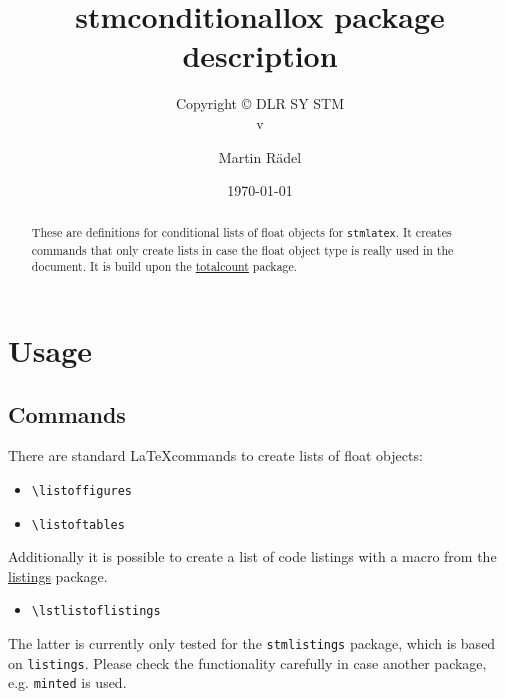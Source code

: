 \documentclass[%
  type=article,%
  layout=koma,%
  hyperref=true,%
  conditionallox=false,%
  date=true,%
  listings=true%
]{stmtext}
\author{Martin R\"{a}del}
\title{stmconditionallox package description}
\subtitle{Copyright \copyright{} \the\year{} DLR SY STM\\v\formatdate[versiondatestyle]{\DTMToday}}
\date{\today}
\begin{document}
\maketitle

\begin{abstract}
These are definitions for conditional lists of float objects for \texttt{stmlatex}. It creates commands that only create lists in case the float object type is really used in the document. It is build upon the \href{https://ctan.org/pkg/totalcount}{totalcount} package.
\end{abstract}

\tableofcontents

\conditionallistoffigures  %
\conditionallistoftables   %
\conditionallistoflistings %

\section{Usage}

\subsection{Commands}

There are standard \LaTeX commands to create lists of float objects:

\begin{itemize}
  \item \verb+\listoffigures+
  \item \verb+\listoftables+
\end{itemize}

Additionally it is possible to create a list of code listings with a macro from the \href{https://ctan.org/pkg/listings}{listings} package.

\begin{itemize}
  \item \verb+\lstlistoflistings+
\end{itemize}

The latter is currently only tested for the \texttt{stmlistings} package, which is based on \texttt{listings}. Please check the functionality carefully in case another package, e.g. \texttt{minted} is used.
\end{document}
